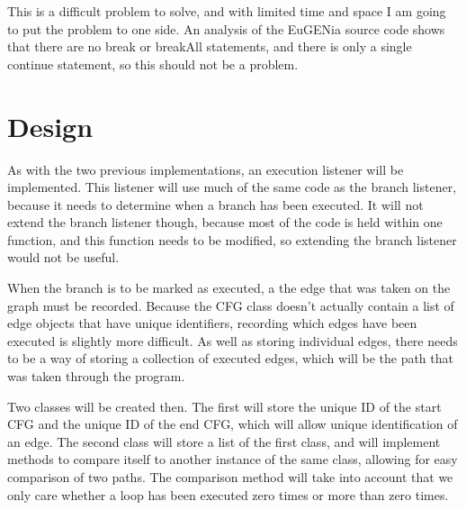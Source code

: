 This is a difficult problem to solve, and with limited time and space I am going to put the problem to one side. An analysis of the EuGENia source code shows that there are no break or breakAll statements, and there is only a single continue statement, so this should not be a problem. 

\section{Design}

As with the two previous implementations, an execution listener will be implemented. This listener will use much of the same code as the branch listener, because it needs to determine when a branch has been executed. It will not extend the branch listener though, because most of the code is held within one function, and this function needs to be modified, so extending the branch listener would not be useful.

When the branch is to be marked as executed, a the edge that was taken on the graph must be recorded. Because the CFG class doesn't actually contain a list of edge objects that have unique identifiers, recording which edges have been executed is slightly more difficult. As well as storing individual edges, there needs to be a way of storing a collection of executed edges, which will be the path that was taken through the program. 

Two classes will be created then. The first will store the unique ID of the start CFG and the unique ID of the end CFG, which will allow unique identification of an edge. The second class will store a list of the first class, and will implement methods to compare itself to another instance of the same class, allowing for easy comparison of two paths. The comparison method will take into account that we only care whether a loop has been executed zero times or more than zero times.
